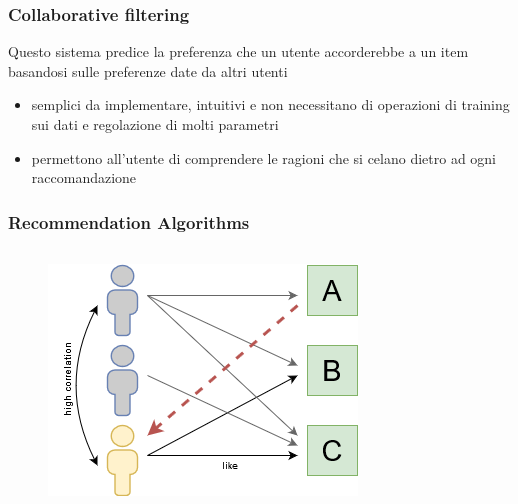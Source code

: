 \begin{frame}
    \frametitle{Collaborative filtering}
    Questo sistema predice la preferenza che un utente accorderebbe a un item basandosi sulle preferenze date da altri utenti
    \begin{itemize}
        \item \alert{semplici da implementare}, \alert{intuitivi} e non necessitano di operazioni di training sui dati e 
        regolazione di molti parametri
        \item permettono all'utente di comprendere le ragioni che si celano dietro ad ogni raccomandazione
    \end{itemize}
\end{frame}

\begin{frame}
    \frametitle{Recommendation Algorithms}
    \begin{columns}
        \begin{column}{0.5\textwidth}
            \begin{figure}
                \centering
                \includegraphics[scale=0.5]{images/UB_CF_ex}
           \end{figure}
        \end{column}
        \begin{column}{0.5\textwidth}
            \begin{figure}
                \centering

\end{figure}
\end{column}
\end{columns}
\end{frame}
